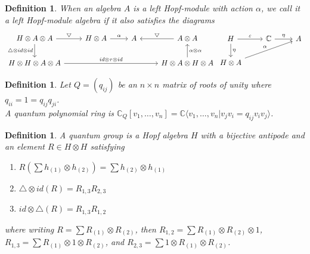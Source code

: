 \documentclass[12pt,a4paper]{article}
\newtheorem{definition}[theorem]{Definition}
\newcommand\1{_{(1)}}
\newcommand\2{_{(2)}}
\begin{document}
\begin{definition}
When an algebra $A$ is a left Hopf-module with action $\alpha$, we call it a left Hopf-module algebra if it also satisfies the diagrams
\[
\begin{tikzcd}
H\otimes A\otimes A \arrow[r, "\bigtriangledown"] \arrow[d, "\triangle\otimes id\otimes id"'] & H\otimes A \arrow[r, "\alpha"] & A & A\otimes A \arrow[l, "\bigtriangledown"']                         \\
H\otimes H\otimes A\otimes A \arrow[rrr, "id\otimes\tau\otimes id"]                        &                                &   & H\otimes A\otimes H\otimes A \arrow[u, "\alpha\otimes\alpha"']
\end{tikzcd}
\begin{tikzcd}
H \arrow[r, "\varepsilon"] \arrow[d, "\eta"] & \mathbb{C} \arrow[r, "\eta"] & A \\
H\otimes A \arrow[rru, "\alpha"]             &                       &  
\end{tikzcd}
\]
\end{definition}

\begin{definition}
Let $Q=(q_{ij})$ be an $n\times n$ matrix of roots of unity where $q_{ii}=1=q_{ij}q_{ji}$.
\\A quantum polynomial ring is $\mathbb{C}_Q[v_1,\ldots,v_n]=\mathbb{C}\langle v_1,\ldots,v_n\vert v_jv_i=q_{ij}v_iv_j\rangle$.
\end{definition}

\begin{definition}
A quantum group is a Hopf algebra $H$ with a bijective antipode and an element $R\in H\otimes H$ satisfying 
\begin{enumerate}
    \item $R\left(\sum h\1\otimes h\2\right)=\sum h\2\otimes h\1$
    \item $\triangle\otimes id(R)=R_{1,3}R_{2,3}$
    \item $id\otimes\triangle(R)=R_{1,3}R_{1,2}$
\end{enumerate}
where writing $R=\sum R\1\otimes R\2$, then $R_{1,2}=\sum R\1\otimes R\2\otimes 1$, $R_{1,3}=\sum R\1\otimes 1\otimes R\2$, and $R_{2,3}=\sum 1\otimes R\1\otimes R\2$.
\end{definition}
\end{document}
